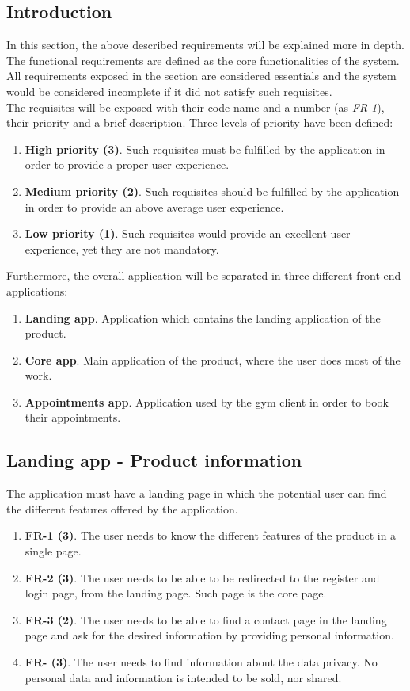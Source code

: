 \documentclass[a4paper, 12pt, oneside]{book}
\begin{document}
\subsection{Introduction}
In this section, the above described requirements will be explained more in depth. The functional requirements are defined as the core functionalities of the system. All requirements exposed in the section are considered essentials and the system would be considered incomplete if it did not satisfy such requisites.
\\[8pt]
The requisites will be exposed with their code name and a number (as \emph{FR-1}), their priority and a brief description. Three levels of priority have been defined:
\begin{enumerate}[label = \arabic{*}.]
	\item \textbf{High priority (3)}. Such requisites must be fulfilled by the application in order to provide a proper user experience.
	\item \textbf{Medium priority (2)}. Such requisites should be fulfilled by the application in order to provide an above average user experience.
	\item \textbf{Low priority (1)}. Such requisites would provide an excellent user experience, yet they are not mandatory.
\end{enumerate}
Furthermore, the overall application will be separated in three different front end applications:
\begin{enumerate}[label = \textbf{\arabic{*}.}]
	\item \textbf{Landing app}. Application which contains the landing application of the product.
	\item \textbf{Core app}. Main application of the product, where the user does most of the work.
	\item \textbf{Appointments app}. Application used by the gym client in order to book their appointments.
\end{enumerate}
\subsection{Landing app - Product information}
The application must have a landing page in which the potential user can find the different features offered by the application.
\begin{enumerate}[label = -]
	\item \textbf{FR-1 (3)}. The user needs to know the different features of the product in a single page.
	\item \textbf{FR-2 (3)}. The user needs to be able to be redirected to the register and login page, from the landing page. Such page is the core page.
	\item \textbf{FR-3 (2)}. The user needs to be able to find a contact page in the landing page and ask for the desired information by providing personal information.
	\item \textbf{FR- (3)}. The user needs to find information about the data privacy. No personal data and information is intended to be sold, nor shared.
\end{enumerate}
\end{document}
